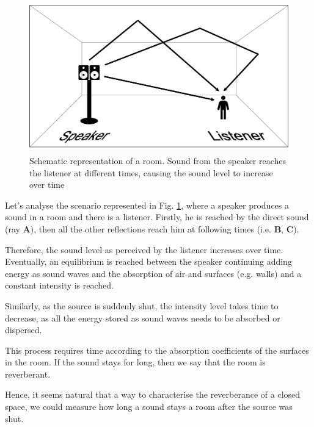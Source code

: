 \documentclass[draft ]{article}
\begin{document}
\begin{figure}[ht!]
\centering
\begin{tcolorbox}

\includegraphics[scale=0.22]{reverberant-box}
\caption{Schematic representation of a room. Sound from the speaker reaches the listener at different times, causing the sound level to increase over time}
\label{fig:box}

\end{tcolorbox}\par\bigskip
\end{figure}

Let's analyse the scenario represented in Fig. \ref{fig:box}, where a speaker produces a sound in a room and there is a listener. Firstly, he is reached by the direct sound (ray \textbf{A}), then all the other reflections reach him at following times (i.e. \textbf{B}, \textbf{C}).

Therefore, the sound level as perceived by the listener increases over time. Eventually, an equilibrium is reached between the speaker continuing adding energy as sound waves and the absorption of air and surfaces (e.g. walls) and a constant intensity is reached.

Similarly, as the source is suddenly shut, the intensity level takes time to decrease, as all the energy stored as sound waves needs to be absorbed or dispersed. 

This process requires time according to the absorption coefficients of the surfaces in the room. If the sound stays for long, then we say that the room is reverberant.

Hence, it seems natural that a way to characterise the reverberance of a closed space, we could measure how long a sound stays a room after the source was shut.
\end{document}
